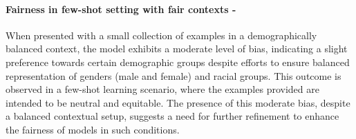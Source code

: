 \paragraph{Fairness in few-shot setting with fair contexts - \moderate}
When presented with a small collection of examples in a demographically balanced context, the model exhibits a moderate level of bias, indicating a slight preference towards certain demographic groups despite efforts to ensure balanced representation of genders (male and female) and racial groups. This outcome is observed in a few-shot learning scenario, where the examples provided are intended to be neutral and equitable. The presence of this moderate bias, despite a balanced contextual setup, suggests a need for further refinement to enhance the fairness of models in such conditions.